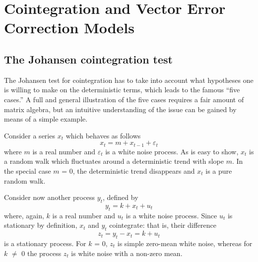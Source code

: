\section{Cointegration and Vector Error Correction Models}
\label{vecm-explanation}

\subsection{The Johansen cointegration test}
\label{sec:johansen-test}

The Johansen test for cointegration has to take into account what
hypotheses one is willing to make on the deterministic terms, which
leads to the famous ``five cases.'' A full and general illustration of
the five cases requires a fair amount of matrix algebra, but an
intuitive understanding of the issue can be gained by means of a
simple example.
    
Consider a series $x_t$ which behaves as follows
%      
\[ x_t = m + x_{t-1} + \varepsilon_t \] 
%
where $m$ is a real number and $\varepsilon_t$ is a white noise
process. As is easy to show, $x_t$ is a random walk which fluctuates
around a deterministic trend with slope $m$. In the special case $m$ =
0, the deterministic trend disappears and $x_t$ is a pure random walk.
    
Consider now another process $y_t$, defined by
%      
\[ y_t = k + x_t + u_t \] 
%
where, again, $k$ is a real number and $u_t$ is a white noise process.
Since $u_t$ is stationary by definition, $x_t$ and $y_t$ cointegrate:
that is, their difference
%      
\[ z_t = y_t - x_t = k + u_t \]
%	
is a stationary process. For $k$ = 0, $z_t$ is simple zero-mean white
noise, whereas for $k$ $\ne$ 0 the process $z_t$ is white noise with a
non-zero mean.
  
